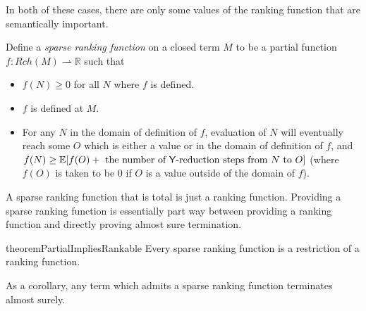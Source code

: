 In both of these cases, there are only some values of the ranking function that are semantically important. 
\begin{definition}
Define a \emph{sparse ranking function} on a closed term $M$ to be a partial function $f : Rch(M) \rightharpoonup \mathbb R$ such that
\begin{itemize}
    \item $f(N) \geq 0$ for all $N$ where $f$ is defined.
    \item $f$ is defined at $M$.
    \item For any $N$ in the domain of definition of $f$, evaluation of $N$ will eventually 
     reach some $O$ which is either a value or in the domain of definition of $f$, and $f(N) \geq \mathbb E[f(O) + \text{ the number of $\mathsf{Y}$-reduction steps from $N$ to $O$}]$ (where $f(O)$ is taken to be 0 if $O$ is a value outside of the domain of $f$).
\end{itemize}
\end{definition}
A sparse ranking function that is total is just a ranking function. Providing a sparse ranking function is essentially part way between providing a ranking function and directly proving almost sure termination.

\begin{restatable}{theorem}{PartialImpliesRankable} \label{thm:partial implies rankable}
Every sparse ranking function is a restriction of a ranking function.
\end{restatable}


As a corollary, any term which admits a sparse ranking function terminates almost surely.

